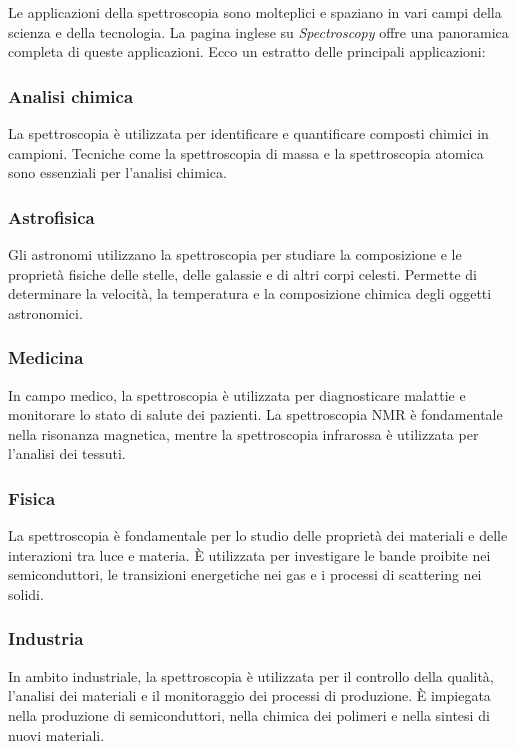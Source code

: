 \documentclass[12pt,a4paper]{report}
\begin{document}
Le applicazioni della spettroscopia sono molteplici e spaziano in vari campi della scienza e della tecnologia. La pagina inglese su \textit{Spectroscopy} offre una panoramica completa di queste applicazioni. Ecco un estratto delle principali applicazioni:

\subsubsection{Analisi chimica}

La spettroscopia è utilizzata per identificare e quantificare composti chimici in campioni. Tecniche come la spettroscopia di massa e la spettroscopia atomica sono essenziali per l'analisi chimica.

\subsubsection{Astrofisica}

Gli astronomi utilizzano la spettroscopia per studiare la composizione e le proprietà fisiche delle stelle, delle galassie e di altri corpi celesti. Permette di determinare la velocità, la temperatura e la composizione chimica degli oggetti astronomici.

\subsubsection{Medicina}

In campo medico, la spettroscopia è utilizzata per diagnosticare malattie e monitorare lo stato di salute dei pazienti. La spettroscopia NMR è fondamentale nella risonanza magnetica, mentre la spettroscopia infrarossa è utilizzata per l'analisi dei tessuti.

\subsubsection{Fisica}

La spettroscopia è fondamentale per lo studio delle proprietà dei materiali e delle interazioni tra luce e materia. È utilizzata per investigare le bande proibite nei semiconduttori, le transizioni energetiche nei gas e i processi di scattering nei solidi.

\subsubsection{Industria}

In ambito industriale, la spettroscopia è utilizzata per il controllo della qualità, l'analisi dei materiali e il monitoraggio dei processi di produzione. È impiegata nella produzione di semiconduttori, nella chimica dei polimeri e nella sintesi di nuovi materiali.
\end{document}
